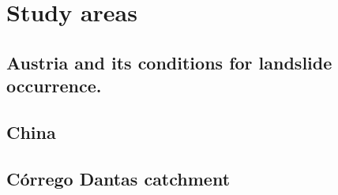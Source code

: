 \chapter{Study areas}
{\textcolor{red}{ \lipsum[1-2]}}
\section{Austria and its conditions for landslide occurrence.} 

\label{StudyAreaAustria}
{\textcolor{red}{ \lipsum[1-2]}}

\section{China} \label{StudyAreaChina}
{\textcolor{red}{ \lipsum[1-2]}}

\section{Córrego Dantas catchment} \label{StudyAreaDantas}

{\textcolor{red}{ \lipsum[1-2]}}
{\textcolor{red}{ \lipsum[1-2]}}